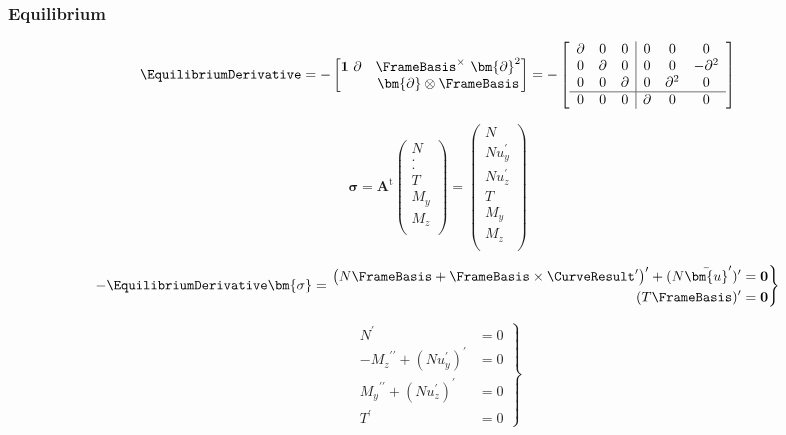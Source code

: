 \subsubsection{Equilibrium}

$$
\EquilibriumDerivative 
 = -\begin{bmatrix}
\mathbf{1}~\partial  & \FrameBasis^{\times} ~\bm{\partial}^2 \\
 & \bm{\partial} \otimes \FrameBasis 
\end{bmatrix}
= -\left[\begin{array}{ccc|ccc}
\partial & 0 & 0 & 0 & 0 & 0\\
0 & \partial & 0    & 0 & 0 & -\partial^2 \\
0 & 0 & \partial    & 0 & \partial^2 & 0  \\ \hline
0 & 0 & 0            & \partial & 0 & 0  \\
\end{array}\right]
$$

\[
\bm{\sigma}
= \bm{A}^\mathrm{t} \begin{pmatrix}
    N \\ 
    . \\
    . \\
    T \\
    M_y \\ 
    M_z \\ 
  \end{pmatrix}
= \begin{pmatrix}
N \\
N u_y^{\prime} \\ 
N u_z^{\prime} \\ \hline 
T \\
M_y \\
M_z \\
\end{pmatrix}
\]

$$
-\EquilibriumDerivative\bm{\sigma}
=
\left.
\begin{aligned}
  \left(N\FrameBasis  + \FrameBasis \times\CurveResult^{\prime}\right)^{\prime} + (N \bar{\bm{u}}^{\prime})^{\prime} &= \mathbf{0} \\
  (T\FrameBasis )^{\prime} &= \mathbf{0}
\end{aligned}
\right\}
$$


$$
\left.\begin{array}{rl}
N^{\prime} & =0 \\
-{M_z}^{\prime\prime}+\left(N u_y^{\prime}\right)^{\prime} & =0 \\
{M_y}^{\prime\prime} +\left(N u_z^{\prime}\right)^{\prime} & =0 \\
T^{\prime} & =0
\end{array}\right\}
$$

